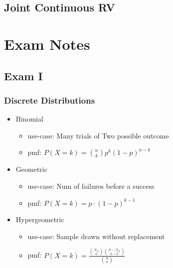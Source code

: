 \documentclass{report}
\begin{document}
  \section{Joint Continuous RV}%
    
  
  
\chapter{Exam Notes}%
  \section*{Exam I}%
    \subsection*{Discrete Distributions}%
      \begin{itemize}
        \item Binomial
          \begin{itemize}
            \item use-case: Many trials of Two possible outcome
            \item pmf: $P(X=k) = \binom{n}{k} p^k (1-p)^{n-k}$
          \end{itemize}
        \item Geometric
          \begin{itemize}
            \item use-case: Num of failures before a success
            \item pmf: $P(X=k) = p \cdot (1-p)^{k-1}$
          \end{itemize}
        \item Hypergeometric
          \begin{itemize}
            \item use-case: Sample drawn without replacement
            \item pmf: $P(X=k) = \frac{\binom{N_A}{k}\binom{N-N_A}{n-k}}{\binom{N}{n}} $
          \end{itemize}

      \end{itemize}
\end{document}
